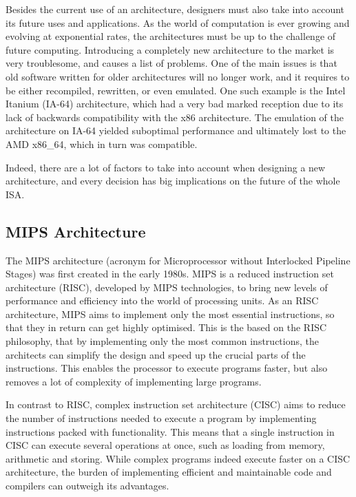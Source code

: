 Besides the current use of an architecture, designers must also take into
account its future uses and applications. As the world of computation is ever
growing and evolving at exponential rates, the architectures must be up to the
challenge of future computing. Introducing a completely new architecture to
the market is very troublesome, and causes a list of problems.
One of the main issues is that old software written for older architectures
will no longer work, and it requires to be either recompiled, rewritten,
or even emulated. One such example is the Intel Itanium (IA-64) architecture,
which had a very bad marked reception due to its lack of backwards
compatibility
with the x86 architecture. The emulation of the architecture on IA-64 yielded
suboptimal performance and ultimately lost to the AMD x86\_64, which in
turn was
compatible.\cite{anandtech:1854}

Indeed, there are a lot of factors to take into account when designing a new
architecture, and every decision has big implications on the future of the
whole ISA.

\subsection{MIPS Architecture}
The MIPS architecture (acronym for Microprocessor without Interlocked Pipeline
Stages) was first created in the early 1980s\cite{imgtec:MIPS_Overview}.
MIPS is a reduced instruction set architecture (RISC), developed by MIPS
technologies, to bring new levels of
performance and efficiency into the world of processing units. As an RISC
architecture, MIPS aims to implement only the most essential instructions, so
that they in return can get highly optimised. This is the based on the RISC
philosophy, that by implementing only the most common instructions, the
architects can simplify the design and speed up the crucial parts of the
instructions. This enables the processor to execute programs faster, but also
removes a lot of complexity of implementing large programs.

In contrast to RISC, complex instruction set architecture (CISC) aims
to reduce the number of instructions needed to execute a program by
implementing instructions packed with functionality. This means that a single
instruction in CISC can execute several operations at once, such as loading
from memory, arithmetic
and storing. While complex programs indeed execute faster on a CISC
architecture,
the burden of implementing efficient and maintainable code and compilers can
outweigh its advantages. \cite{Patterson:1980:CRI:641914.641917}


